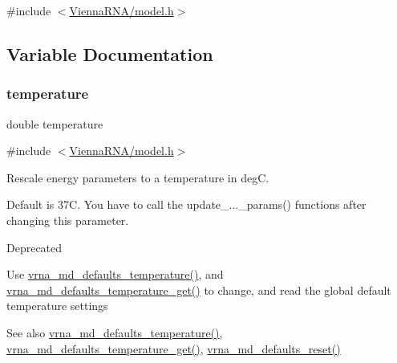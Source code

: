 {\ttfamily \#include $<$\mbox{\hyperlink{model_8h}{Vienna\+R\+N\+A/model.\+h}}$>$}



\subsection{Variable Documentation}
\mbox{\label{group__model__details_gab4b11c8d9c758430960896bc3fe82ead}} 
\subsubsection{\texorpdfstring{temperature}{temperature}}
{\footnotesize\ttfamily double temperature}



{\ttfamily \#include $<$\mbox{\hyperlink{model_8h}{Vienna\+R\+N\+A/model.\+h}}$>$}



Rescale energy parameters to a temperature in degC. 

Default is 37C. You have to call the update\+\_\+...\+\_\+params() functions after changing this parameter. \begin{DoxyRefDesc}{Deprecated}
\item[\mbox{\hyperlink{deprecated__deprecated000090}{Deprecated}}]Use \mbox{\hyperlink{group__model__details_gaf9e527e9a2f7e6fd6e42bc6e602f5445}{vrna\+\_\+md\+\_\+defaults\+\_\+temperature()}}, and \mbox{\hyperlink{group__model__details_ga96b24a74437f9ba46c4e06343155bf46}{vrna\+\_\+md\+\_\+defaults\+\_\+temperature\+\_\+get()}} to change, and read the global default temperature settings \end{DoxyRefDesc}
\begin{DoxySeeAlso}{See also}
\mbox{\hyperlink{group__model__details_gaf9e527e9a2f7e6fd6e42bc6e602f5445}{vrna\+\_\+md\+\_\+defaults\+\_\+temperature()}}, \mbox{\hyperlink{group__model__details_ga96b24a74437f9ba46c4e06343155bf46}{vrna\+\_\+md\+\_\+defaults\+\_\+temperature\+\_\+get()}}, \mbox{\hyperlink{group__model__details_ga70834424cf804d149937de89f80ceb45}{vrna\+\_\+md\+\_\+defaults\+\_\+reset()}} 
\end{DoxySeeAlso}
\mbox{\label{group__model__details_gad3b22044065acc6dee0af68931b52cfd}} 
